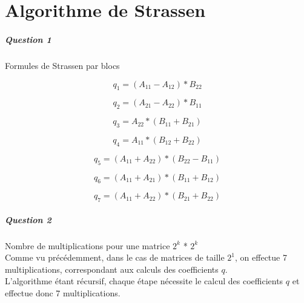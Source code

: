 \documentclass[a4paper,10pt,margin=2in]{report}
\begin{document}
\chapter{Algorithme de Strassen}
\paragraph{Question 1}
Formules de Strassen par blocs

\begin{equation}
q_1 = (A_{11} - A_{12}) * B_{22}
\end{equation}

\begin{equation}
q_2 = (A_{21} - A_{22}) * B_{11}
\end{equation}

\begin{equation}
q_3 = A_{22} * (B_{11} + B_{21})
\end{equation}

\begin{equation}
q_4 = A_{11} * (B_{12} + B_{22})
\end{equation}

\begin{equation}
q_5 = (A_{11} + A_{22}) * (B_{22} - B_{11})
\end{equation}

\begin{equation}
q_6 = (A_{11} + A_{21}) * (B_{11} + B_{12})
\end{equation}

\begin{equation}
q_7 = (A_{11} + A_{22}) * (B_{21} + B_{22})
\end{equation}

\paragraph{Question 2}
Nombre de multiplications pour une matrice $2^k$ * $2^k$\\


Comme vu précédemment, dans le cas de matrices de taille $2^1$, on effectue 7 multiplications, correspondant aux calculs des coefficients $q$.\\

L'algorithme étant récursif, chaque étape nécessite le calcul des coefficients $q$ et effectue donc 7 multiplications.\\
\end{document}
